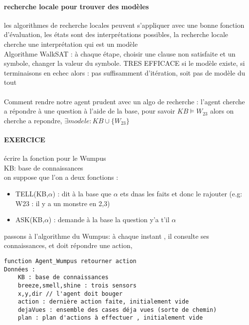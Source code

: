 \documentclass{article}
\begin{document}
\paragraph{recherche locale pour trouver des modèles} les algorithmes de recherche locales peuvent s'appliquer avec une bonne fonction d'évaluation, les états sont des interprétations possibles, la recherche locale cherche une interprétation  qui est un modèle\\Algorithme WalkSAT : à chaque étape, choisir une clause non satisfaite et un symbole, changer la valeur du symbole. TRES EFFICACE si le modèle existe, si terminaisons en echec alors : pas suffisamment d'itération, soit pas de modèle du tout\\\\Comment rendre notre agent prudent avec un algo de recherche : l'agent cherche a répondre à une question à l'aide de la base, pour savoir $KB \models W_{23}$ alors on cherche a repondre, $ \exists modele : KB \cup \{W_{23}\}$

\paragraph{EXERCICE} écrire la fonction pour le Wumpus\\KB: base de connaissances\\on suppose que l'on a deux fonctions : \begin{itemize}
\item TELL(KB,$\alpha$) : dit à la base que $\alpha$ ets dnas les faits et donc le rajouter (e.g: W23 : il y a un monstre en 2,3)
\item ASK(KB,$\alpha$) : demande à la base la question y'a t'il $\alpha$
\end{itemize}

passons à l'algorithme du Wumpus: à chaque instant , il consulte ses connaissances, et doit répondre une action, 
\begin{verbatim}
function Agent_Wumpus retourner action
Données :
	KB : base de connaissances
	breeze,smell,shine : trois sensors
	x,y,dir // l'agent doit bouger
	action : dernière action faite, initialement vide
	dejaVues : ensemble des cases déja vues (sorte de chemin)
	plan : plan d'actions à effectuer , initialement vide
\end{verbatim}
\end{document}
